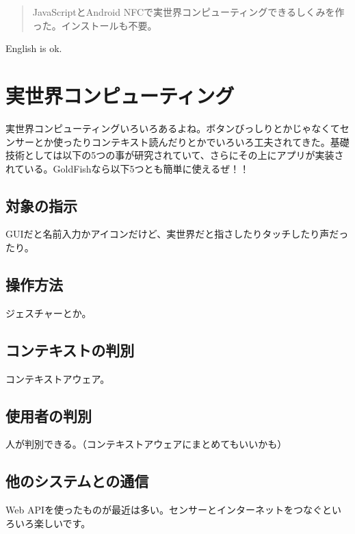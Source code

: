
\begin{abstract}
JavaScriptとAndroid NFCで実世界コンピューティングできるしくみを作った。インストールも不要。
\end{abstract}

\begin{eabstract}
English is ok.
\end{eabstract}

\maketitle

\section{実世界コンピューティング}\label{sec:Introduction}
実世界コンピューティングいろいろあるよね。ボタンびっしりとかじゃなくてセンサーとか使ったりコンテキスト読んだりとかでいろいろ工夫されてきた。基礎技術としては以下の5つの事が研究されていて、さらにその上にアプリが実装されている。GoldFishなら以下5つとも簡単に使えるぜ！！

\subsection{対象の指示}
GUIだと名前入力かアイコンだけど、実世界だと指さしたりタッチしたり声だったり。

\subsection{操作方法}
ジェスチャーとか。

\subsection{コンテキストの判別}
コンテキストアウェア。

\subsection{使用者の判別}
人が判別できる。（コンテキストアウェアにまとめてもいいかも）

\subsection{他のシステムとの通信}
Web APIを使ったものが最近は多い。センサーとインターネットをつなぐといろいろ楽しいです。


